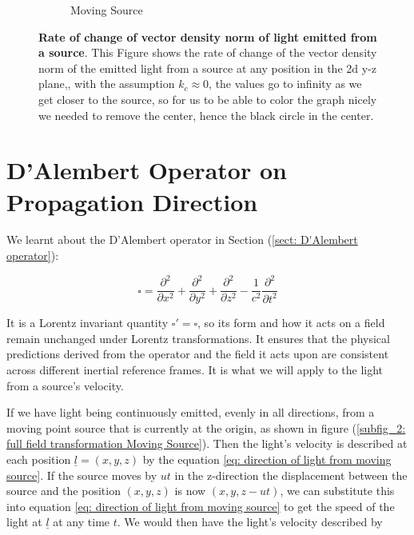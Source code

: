 \begin{figure}[H]
\begin{subfigure}{0.45\textwidth}
		\caption{Moving Source}
		\label{subfig_2: light emitted from a source's rate of change of vector density norm}
	\end{subfigure}
	\caption{\textbf{Rate of change of vector density norm of light emitted from a source}. This Figure shows the rate of change of the vector density norm of the emitted light from a source at any position in the 2d y-z plane,, with the assumption $k_c\approx 0$, the values go to infinity as we get closer to the source, so for us to be able to color the graph nicely we needed to remove the center, hence the black circle in the center.}
	\label{fig: light emitted from a source's rate of change of vector density norm}
\end{figure}

\section{D'Alembert Operator on Propagation Direction}\label{sect: D'Alembert Operator on Propagation Direction}

We learnt about the D'Alembert operator in Section (\ref{sect: D'Alembert operator}):

\begin{equation}
	\square =  \frac{\partial^2}{\partial x^2} + \frac{\partial^2}{\partial y^2} + \frac{\partial^2}{\partial z^2} - \frac{1}{c^2}\frac{\partial^2}{\partial t^2}
\end{equation}

It is a Lorentz invariant quantity $\square'=\square$, so its form and how it acts on a field remain unchanged under Lorentz transformations.
It ensures that the physical predictions derived from the operator and the field it acts upon are consistent across different inertial reference frames.
It is what we will apply to the light from a source's velocity.



If we have light being continuously emitted, evenly in all directions, from a moving point source that is currently at the origin, as shown in figure (\ref{subfig_2: full field transformation Moving Source}).
Then the light's velocity is described at each position $\underline{l}=(x,y,z)$ by the equation \eqref{eq: direction of light from moving source}.
If the source moves by $ut$ in the z-direction the displacement between the source and the position $(x,y,z)$ is now $(x,y,z-ut)$, we can substitute this into equation \eqref{eq: direction of light from moving source} to get the speed of the light at $\underline{l}$ at any time $t$.
We would then have the light's velocity described by

